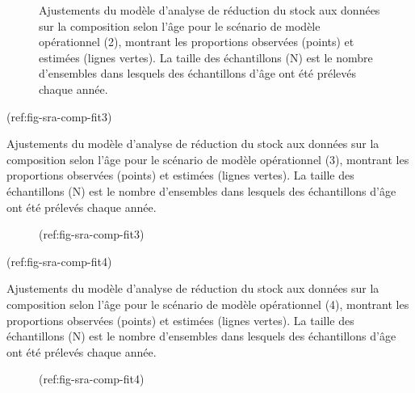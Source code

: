 \documentclass[11pt]{book}
\begin{document}
\begin{figure}[htb]

{\centering {} 

}

\caption{Ajustements du modèle d'analyse de réduction du stock aux données sur la composition selon l'âge pour le scénario de modèle opérationnel (2), montrant les proportions observées (points) et estimées (lignes vertes). La taille des échantillons (N) est le nombre d'ensembles dans lesquels des échantillons d'âge ont été prélevés chaque année.}\label{fig:sra-conditioned-comp-fit2}
\end{figure}
\clearpage

(ref:fig-sra-comp-fit3)

Ajustements du modèle d'analyse de réduction du stock aux données sur la composition selon l'âge pour le scénario de modèle opérationnel (3), montrant les proportions observées (points) et estimées (lignes vertes). La taille des échantillons (N) est le nombre d'ensembles dans lesquels des échantillons d'âge ont été prélevés chaque année.
\begin{figure}[htb]

{\centering {} 

}

\caption{(ref:fig-sra-comp-fit3)}\label{fig:sra-conditioned-comp-fit3}
\end{figure}
\clearpage

(ref:fig-sra-comp-fit4)

Ajustements du modèle d'analyse de réduction du stock aux données sur la composition selon l'âge pour le scénario de modèle opérationnel (4), montrant les proportions observées (points) et estimées (lignes vertes). La taille des échantillons (N) est le nombre d'ensembles dans lesquels des échantillons d'âge ont été prélevés chaque année.
\begin{figure}[htb]

{\centering {} 

}

\caption{(ref:fig-sra-comp-fit4)}\label{fig:sra-conditioned-comp-fit4}
\end{figure}
\clearpage
\end{document}
